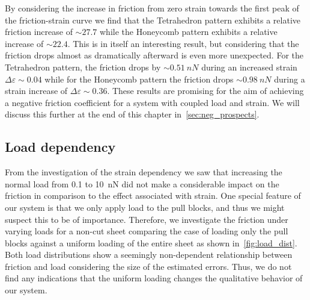 By considering the increase in friction from zero strain towards the first peak
of the friction-strain curve we find that the Tetrahedron pattern exhibits a
relative friction increase of $\sim 27.7$ while the Honeycomb pattern exhibits a
relative increase of $\sim 22.4$. This is in itself an interesting result, but
considering that the friction drops almost as dramatically afterward is even more unexpected. For the Tetrahedron pattern, the friction drops by
$\sim \SI{0.51}{nN}$ during an increased strain $\Delta \varepsilon \sim 0.04$
while for the Honeycomb pattern the friction drops $\sim\SI{0.98}{nN}$ during a strain increase of $\Delta \varepsilon \sim 0.36$. These results are promising for the aim of achieving a negative friction coefficient for a system with coupled load and strain. We will discuss this further at the end of this chapter in~\cref{sec:neg_prospects}.



\subsection{Load dependency}\label{sec:load_dependency}
From the investigation of the strain dependency we saw that increasing the normal load from 0.1 to \SI{10}{nN} did not make a considerable impact on the friction in comparison to the effect associated with strain. One special feature of our system is that we only apply load to the pull blocks, and thus we might suspect this to be of importance. Therefore, we investigate the friction under varying loads for a non-cut sheet comparing the case of loading only the pull blocks against a uniform loading of the entire sheet as shown in~\cref{fig:load_dist}. Both load distributions show a seemingly non-dependent relationship between friction and load considering the size of the estimated errors. Thus, we do not find any indications that the uniform loading changes the qualitative behavior of our system.

